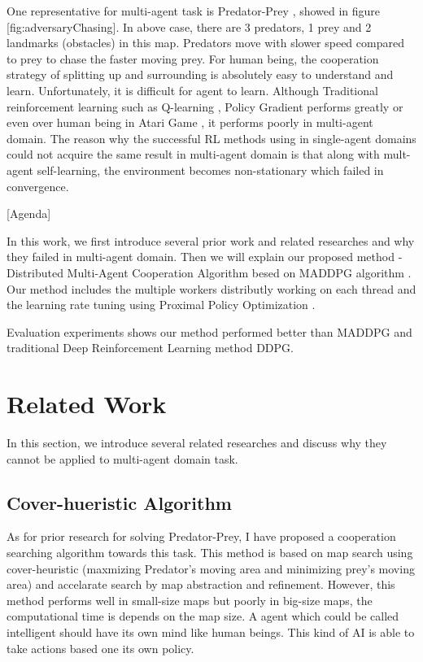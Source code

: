 \documentclass[11pt,twocolumn]{jarticle} %
\begin{document}
One representative for multi-agent task is Predator-Prey \cite{4}, showed in figure [fig:adversaryChasing]. In above case, there are 
3 predators, 1 prey and 2 landmarks (obstacles) in this map. Predators move with slower speed compared to prey to chase the faster moving prey. For human being, the cooperation strategy of splitting up and surrounding is absolutely easy to understand and learn. Unfortunately, it is difficult for agent to learn. Although Traditional reinforcement learning such as Q-learning \cite{5}, Policy Gradient \cite{6} performs greatly or even over human being in Atari Game \cite{7}, it performs poorly in multi-agent domain. The reason why the successful RL methods using in single-agent domains could not acquire the same result in multi-agent domain is that along with mult-agent self-learning, the environment becomes non-stationary which failed in convergence. \par

[Agenda] \par
In this work, we first introduce several prior work and related researches and why they failed in multi-agent domain. Then we will explain our proposed method - Distributed Multi-Agent Cooperation Algorithm besed on MADDPG algorithm \cite{4}. Our method includes the multiple workers distributly working on each thread and the learning rate tuning using Proximal Policy Optimization \cite{8}. \par

Evaluation experiments shows our method performed better than MADDPG and traditional Deep Reinforcement Learning method DDPG. \par

\section{Related Work} 
In this section, we introduce several related researches and discuss why they cannot be applied to multi-agent domain task.
\subsection{Cover-hueristic Algorithm}
As for prior research for solving Predator-Prey, I have proposed a cooperation searching algorithm  \cite{9} towards this task. This method is based on map search using cover-heuristic (maxmizing Predator's moving area and minimizing prey's moving area) and accelarate search by map abstraction and refinement. However, this method performs well in small-size maps but poorly in big-size maps, the computational time is depends on the map size. A agent which could be called intelligent should have its own mind like human beings. This kind of AI is able to take actions based one its own policy.\par
\end{document}
